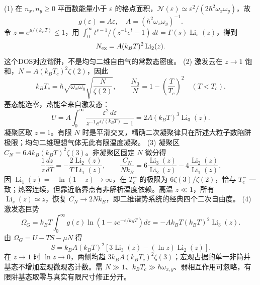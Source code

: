 (1) 在 \(n_x,n_y\ge0\) 平面数能量小于 \(\varepsilon\) 的格点面积，\(\mathcal N(\varepsilon)\simeq\varepsilon^2/(2\hbar^2\omega_x\omega_y)\)，故
\[
g(\varepsilon)=A\varepsilon,\quad A=(\hbar^2\omega_x\omega_y)^{-1}.
\]
令 \(z=e^{\mu/(k_BT)}\le1\)，用 \(\int_0^\infty t^{s-1}/(z^{-1}e^t-1)\,dt=\Gamma(s)\operatorname{Li}_s(z)\)，得到
\[
N_{\rm ex}=A(k_BT)^2\operatorname{Li}_2(z).
\]
这个DOS对应谐阱，不是均匀二维自由气的常数态密度。
(2) 激发云在 \(z\to1\) 饱和，\(N=A(k_BT_c)^2\zeta(2)\)，因此
\[
\boxed{k_BT_c=\hbar\sqrt{\omega_x\omega_y}\sqrt{\frac N{\zeta(2)}}},\qquad
\frac{N_0}{N}=1-\left(\frac{T}{T_c}\right)^2\quad(T<T_c).
\]
基态能选零，热能全来自激发态：
\[
U=A\int_0^\infty\frac{\varepsilon^2\,d\varepsilon}{z^{-1}e^{\varepsilon/(k_BT)}-1}
=2A(k_BT)^3\operatorname{Li}_3(z).
\]
凝聚区取 \(z=1\)。有限 \(N\) 时是平滑交叉，精确二次凝聚律只在所述大粒子数陷阱极限；均匀二维理想气体无此有限温度凝聚。
(3) 凝聚区 \(C_N=6Ak_B(k_BT)^2\zeta(3)\)。非凝聚区固定 \(N\) 微分得
\[
\frac1z\frac{dz}{dT}=-\frac{2\operatorname{Li}_2(z)}{T\operatorname{Li}_1(z)},\qquad
\boxed{\frac{C_N}{Nk_B}=6\frac{\operatorname{Li}_3(z)}{\operatorname{Li}_2(z)}
-4\frac{\operatorname{Li}_2(z)}{\operatorname{Li}_1(z)}}.
\]
因 \(\operatorname{Li}_1(z)=-\ln(1-z)\to\infty\)，在 \(T_c^+\) 的极限为 \(6\zeta(3)/\zeta(2)\)，恰与 \(T_c^-\) 一致；热容连续，但靠近临界点有非解析温度依赖。高温 \(z\ll1\)，所有 \(\operatorname{Li}_s(z)\simeq z\)，恢复 \(C_N\to2Nk_B\)，即二维谐势系统的经典四个二次自由度。
(4) 激发态巨势
\[
\Omega_G=k_BT\int_0^\infty g(\varepsilon)\ln(1-ze^{-\varepsilon/k_BT})d\varepsilon
=-Ak_BT(k_BT)^2\operatorname{Li}_3(z).
\]
由 \(\Omega_G=U-TS-\mu N\) 得
\[
S=k_BA(k_BT)^2[3\operatorname{Li}_3(z)-(\ln z)\operatorname{Li}_2(z)].
\]
在 \(z\to1\) 时 \(\ln z\to0\)，两侧均趋 \(3k_BA(k_BT_c)^2\zeta(3)\)；宏观占据的单一非简并基态不增加宏观微观态计数。需 \(N\gg1\)、\(k_BT_c\gg\hbar\omega_{x,y}\)、弱相互作用可忽略，有限阱基态取零与真实有限尺寸修正分开。

